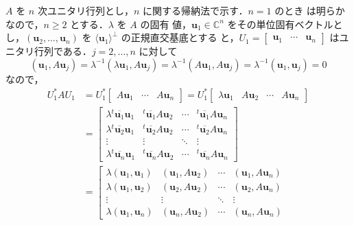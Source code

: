\documentclass[11pt, uplatex, dvipdfmx, titlepage]{jsarticle}
\makeatletter
\renewcommand{\bar}[1]{\overline{#1}}
\renewenvironment{proof}[1][\proofname]{\par
  \pushQED{\qed}%
  \normalfont \topsep6\p@\@plus6\p@\relax
  \trivlist
  \item[\hskip\labelsep
         \bfseries
    {#1}]\ignorespaces
}{%
  \popQED\endtrivlist\@endpefalse
}
\theoremstyle{definition}
\renewcommand{\proofname}{\textbf{証明}}
\makeatother
\begin{document}
\begin{proof}
  $A$ を $n$ 次ユニタリ行列とし，$n$ に関する帰納法で示す．$n=1$ のとき
  は明らかなので，$n \geq 2$ とする．$\lambda$ を $A$ の固有
  値，$\bm{u}_1 \in \mathbb{C}^n$ をその単位固有ベクトルと
  し，$(\bm{u}_2, \ldots, \bm{u}_n)$
  を $\langle \bm{u}_1 \rangle ^{\perp}$ の正規直交基底とする
  と，$U_1=\left[
    \begin{array}{ccc}
      \bm{u}_1 & \cdots & \bm{u}_n
    \end{array}
  \right]$ はユニタリ行列である．$j=2, \ldots, n$ に対して
  \[
    (\bm{u}_1, A \bm{u}_j) = \lambda^{-1} (\lambda \bm{u}_1,
    A\bm{u}_j) = \lambda^{-1} (A\bm{u}_1, A\bm{u}_j) =
    \lambda^{-1}(\bm{u}_1, \bm{u}_j) =0
  \]
  なので，
  \[
    \begin{aligned}
      U_1^*A U_1 &= U_1^*\left[
        \begin{array}{ccc}
          A \bm{u}_1 & \cdots & A\bm{u}_n
        \end{array}
      \right] = U_1^* \left[
        \begin{array}{cccc}
          \lambda \bm{u}_1 & A \bm{u}_2 & \cdots & A\bm{u}_n
        \end{array}
      \right]\\
      &= \left[
        \begin{array}{cccc}
          \lambda {}^{t}\bar{\bm{u}_1}\bm{u}_1 & {}^{t}\bar{\bm{u}_1} A \bm{u}_2 & \cdots & {}^{t}\bar{\bm{u}_1} A \bm{u}_n\\
          \lambda {}^{t}\bar{\bm{u}_2} \bm{u}_1 & {}^{t} \bar{\bm{u}_2} A\bm{u}_2 & \cdots & {}^{t}\bar{\bm{u}_2 }A \bm{u}_n\\
          \vdots & \vdots & \ddots & \vdots\\
          \lambda {}^{t} \bar{\bm{u}_n} \bm{u}_1 & {}^{t} \bar{\bm{u}_n} A\bm{u}_2 & \cdots & {}^{t}\bar{\bm{u}_n} A \bm{u}_n
        \end{array}
      \right]\\
      &= \left[
        \begin{array}{cccc}
          \lambda (\bm{u}_1, \bm{u}_1) & (\bm{u}_1, A\bm{u}_2) & \cdots & (\bm{u}_1, A\bm{u}_n)\\
          \lambda (\bm{u}_1, \bm{u}_2) & (\bm{u}_2, A\bm{u}_2) & \cdots & (\bm{u}_2, A\bm{u}_n)\\
          \vdots & \vdots & \ddots & \vdots\\
          \lambda (\bm{u}_1, \bm{u}_n) & (\bm{u}_n, A\bm{u}_2) & \cdots & (\bm{u}_n, A\bm{u}_n)
        \end{array}

\end{aligned}\]
\end{proof}
\end{document}
